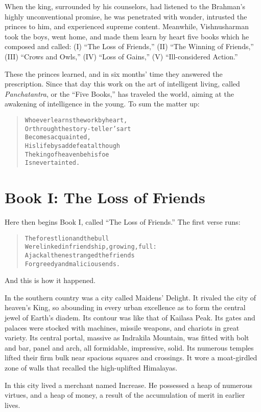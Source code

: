 \documentclass[article, twoside, 14pt]{memoir}
\renewenvironment{verbatim}{%
\begin{quote}%
\vskip -10pt%
\begin{alltt}\normalfont\large}{\end{alltt}%
\end{quote}%
\vskip -10pt
} %
\begin{document}
When the king, surrounded by his counselors, had listened to the
Brahman's highly unconventional promise, he was penetrated with
wonder, intrusted the princes to him, and experienced supreme
content. Meanwhile, Vishnusharman took the boys, went home, and
made them learn by heart five books which he composed and called:
(I) ``The Loss of Friends,'' (II) ``The Winning of Friends,'' (III)
``Crows and Owls,'' (IV) ``Loss of Gains,'' (V)
``Ill-considered Action.''

These the princes learned, and in six months' time they answered
the prescription. Since that day this work on the art of
intelligent living, called \emph{Panchatantra}, or the
``Five Books,'' has traveled the world, aiming at the awakening of
intelligence in the young. To sum the matter up:

\begin{verbatim}
Whoever learns the work by heart,
Or through the story-teller's art
    Becomes acquainted,
His life by sad defeat{\textemdash}although
The king of heaven be his foe{\textemdash}
    Is never tainted.
\end{verbatim}
\part{Book I: The Loss of Friends}

\label{s0}

Here then begins Book I, called ``The Loss of Friends.'' The
first verse runs:

\begin{verbatim}
The forest lion and the bull
Were linked in friendship, growing, full:
A jackal then estranged the friends
For greedy and malicious ends.
\end{verbatim}
And this is how it happened.

In the southern country was a city called Maidens'
\label{s1}Delight. It rivaled the city of heaven's King, so
abounding in every urban excellence as to form the central jewel of
Earth's diadem. Its contour was like that of Kailasa Peak. Its
gates and palaces were stocked with machines, missile weapons, and
chariots in great variety. Its central portal, massive as Indrakila
Mountain, was fitted with bolt and bar, panel and arch, all
formidable, impressive, solid. Its numerous temples lifted their
firm bulk near spacious squares and crossings. It wore a
moat-girdled zone of walls that recalled the high-uplifted
Himalayas.

In this city lived a merchant named Increase. He possessed a heap
of numerous virtues, and a heap of money, a result of the
accumulation of merit in earlier lives.
\end{document}
